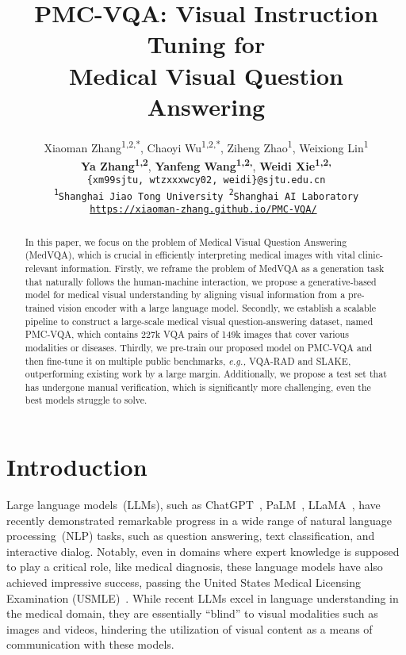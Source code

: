 \documentclass{article}
\title{PMC-VQA: Visual Instruction Tuning for \\ Medical Visual Question Answering}
\author{Xiaoman Zhang\textsuperscript{1,2,*},
  Chaoyi Wu\textsuperscript{1,2,*},
  Ziheng Zhao\textsuperscript{1}, 
  Weixiong Lin\textsuperscript{1} \\  [2pt]
  \textbf{Ya Zhang\textsuperscript{1,2}},
  \textbf{Yanfeng Wang\textsuperscript{1,2,\dag}},
  \textbf{Weidi Xie\textsuperscript{1,2,\dag}}  \\ [2pt]
  \tt\small{\{xm99sjtu, wtzxxxwcy02, weidi\}@sjtu.edu.cn}\\ [2pt]
   \textsuperscript{1}Shanghai Jiao Tong University \quad
   \textsuperscript{2}Shanghai AI Laboratory \\[2pt]
   \url{https://xiaoman-zhang.github.io/PMC-VQA/}
}
\begin{document}
\maketitle

\begin{abstract}
In this paper, we focus on the problem of Medical Visual Question Answering (MedVQA), 
which is crucial in efficiently interpreting medical images with vital clinic-relevant information.
Firstly, we reframe the problem of MedVQA as a generation task that naturally follows the human-machine interaction, we propose a generative-based model for medical visual understanding by aligning visual information from a pre-trained vision encoder with a large language model. 
Secondly, we establish a scalable pipeline to construct a large-scale medical visual question-answering dataset, named PMC-VQA, which contains 227k VQA pairs of 149k images that cover various modalities or diseases. Thirdly, we pre-train our proposed model on PMC-VQA and then fine-tune it on multiple public benchmarks, {\em e.g.,} VQA-RAD and SLAKE, outperforming existing work by a large margin. 
Additionally, we propose a test set that has undergone manual verification, which is significantly more challenging, even the best models struggle to solve.


\end{abstract}

\renewcommand{\thefootnote}{}


\section{Introduction}


Large language models~(LLMs), such as ChatGPT~\cite{chatgpt}, PaLM~\cite{chowdhery2022palm}, LLaMA~\cite{touvron2023llama}, 
have recently demonstrated remarkable progress in a wide range of natural language processing~(NLP) tasks, such as question answering, text classification, and interactive dialog. 
Notably, even in domains where expert knowledge is supposed to play a critical role, like medical diagnosis, these language models have also achieved impressive success, passing the United States Medical Licensing Examination (USMLE)~\cite{jin2021disease, kung2023performance, nori2023capabilities, singhal2022large}. While recent LLMs excel in language understanding in the medical domain, they are essentially ``blind'' to visual modalities such as images and videos, hindering the utilization of visual content as a means of communication with these models.
\end{document}
